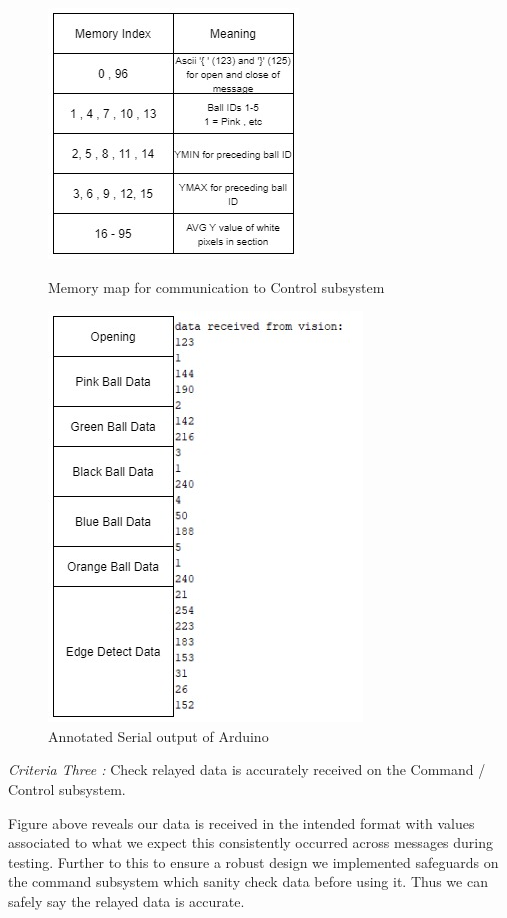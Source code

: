 \documentclass[10pt,twoside]{article}
\begin{document}
\begin{figure}[hbt!]
  \begin{minipage}[b]{0.44\textwidth}
    \centering
    \includegraphics[scale = 0.5]{memoryMap.jpg}
    \caption{Memory map for communication to Control subsystem}
    \label{fig:mem_Map}
  \end{minipage}
  \hfill
  \begin{minipage}[b]{0.44\textwidth}
    \includegraphics[scale = 0.35]{Serial.jpg}
    \caption{Annotated Serial output of Arduino}
    \label{fig:SerialOut}
  \end{minipage}
\end{figure}

\textit{Criteria Three : }Check relayed data is accurately received on the Command / Control subsystem.

Figure above reveals our data is received in the intended format with values associated to what we expect this consistently occurred across messages during testing. Further to this to ensure a robust design we implemented safeguards on the command subsystem which sanity check data before using it. Thus we can safely say the relayed data is accurate. 
\end{document}
